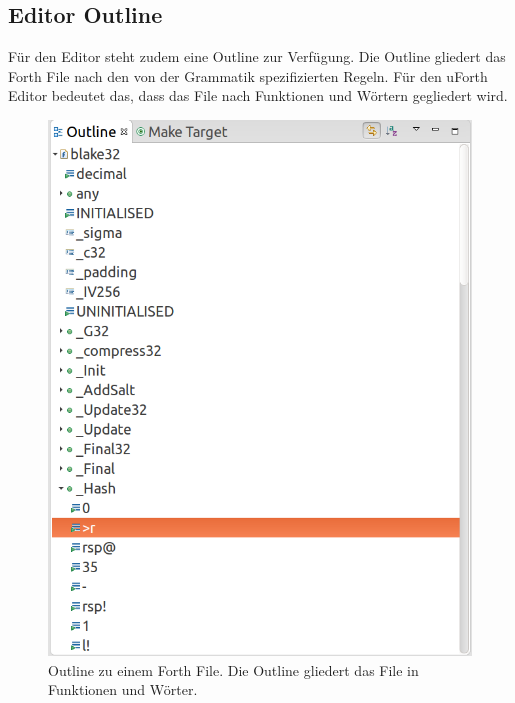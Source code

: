 \subsection{Editor Outline}
Für den Editor steht zudem eine Outline zur Verfügung. Die Outline gliedert das Forth File nach den von der Grammatik spezifizierten Regeln. Für den uForth Editor bedeutet das, dass das File nach Funktionen und Wörtern gegliedert wird.

\begin{figure}[H]
	\centering
		\includegraphics[scale=0.3]{fortheditor/outline.png}
		\caption{Outline zu einem Forth File. Die Outline gliedert das File in Funktionen und Wörter.}
		\label{fig:outlineeditor}
\end{figure}

